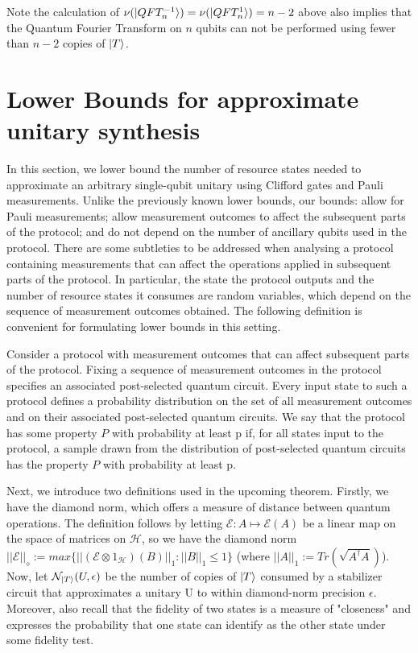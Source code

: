 \documentclass[12pt]{dalthesis}
\begin{document}
Note the calculation of $\nu(\ket{QFT_n^{-1}}) = \nu(\ket{QFT_n^{1}}) = n-2$ above also implies that the Quantum Fourier Transform on $n$ qubits can not be performed using fewer than $n-2$ copies of $\ket{T}$.

\section{Lower Bounds for approximate unitary synthesis}
In this section, we lower bound the number of resource states needed to approximate an arbitrary single-qubit unitary using Clifford gates and Pauli measurements. Unlike the previously known lower bounds, our bounds: allow for Pauli measurements; allow measurement outcomes to affect the subsequent parts of the protocol; and do not depend on the number of ancillary qubits used in the protocol.
There are some subtleties to be addressed when analysing a protocol containing measurements that can affect the operations applied in subsequent parts of the protocol. In particular, the state the protocol outputs and the number of resource states it consumes are random variables, which depend on the sequence of measurement outcomes obtained. The following definition is convenient for formulating lower bounds in this setting.

\begin{definition}
\label{propertydef}
Consider a protocol with measurement outcomes that can affect subsequent parts of the protocol. Fixing a sequence of measurement outcomes in the protocol specifies an associated post-selected quantum circuit. Every input state to such a protocol defines a probability distribution on the set of all measurement outcomes and on their associated post-selected quantum circuits. We say that the protocol has some property $P$ with probability at least p if, for all states input to the protocol, a sample drawn from the distribution of post-selected quantum circuits has the property $P$ with probability at least p.
\end{definition}

Next, we introduce two definitions used in the upcoming theorem. Firstly, we have the diamond norm, which offers a measure of distance between quantum operations. The definition follows by letting $\mathcal{E}:A \mapsto \mathcal{E}(A)$ be a linear map on the space of matrices on $\mathcal{H}$, so we have the diamond norm $||\mathcal{E}||_\diamond := max\{ ||( \mathcal{E} \otimes \mathcal{1}_\mathcal{H})(B)||_1 : ||B||_1 \leq 1 \}$ (where $||A||_1 := \textit{Tr}(\sqrt{A^\dag A})$). Now, let $\mathcal{N}_{\ket{T}}(U, \epsilon)$ be the number of copies of $\ket{T}$ consumed by a stabilizer circuit that approximates a unitary U to within diamond-norm precision $\epsilon$. Moreover, also recall that the fidelity of two states is a measure of "closeness" and expresses the probability that one state can identify as the other state under some fidelity test.
\end{document}
